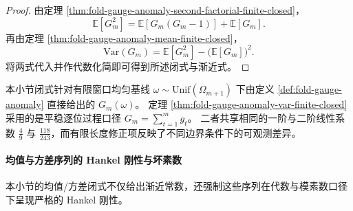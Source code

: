 \begin{proof}
由定理 \ref{thm:fold-gauge-anomaly-second-factorial-finite-closed}，
\[
\mathbb E[G_m^2]=\mathbb E[G_m(G_m-1)]+\mathbb E[G_m].
\]
再由定理 \ref{thm:fold-gauge-anomaly-mean-finite-closed}，
\[
\mathrm{Var}(G_m)=\mathbb E[G_m^2]-\bigl(\mathbb E[G_m]\bigr)^2.
\]
将两式代入并作代数化简即可得到所述闭式与渐近式。
\end{proof}


\begin{remark}[与平稳和口径的关系]\label{rem:fold-gauge-anomaly-finite-vs-stationary-moments}
本小节闭式针对有限窗口均匀基线 \(\omega\sim\mathrm{Unif}(\Omega_{m+1})\) 下由定义 \ref{def:fold-gauge-anomaly} 直接给出的 \(G_m(\omega)\)。
定理 \ref{thm:fold-gauge-anomaly-var-finite-closed} 采用的是平稳逐位过程口径 \(G_m=\sum_{t=1}^m g_t\)。
二者共享相同的一阶与二阶线性系数 \(\frac49\) 与 \(\frac{118}{243}\)，而有限长度修正项反映了不同边界条件下的可观测差异。
\end{remark}

\paragraph{均值与方差序列的 Hankel 刚性与坏素数}
本小节的均值/方差闭式不仅给出渐近常数，还强制这些序列在代数与模素数口径下呈现严格的 Hankel 刚性。

